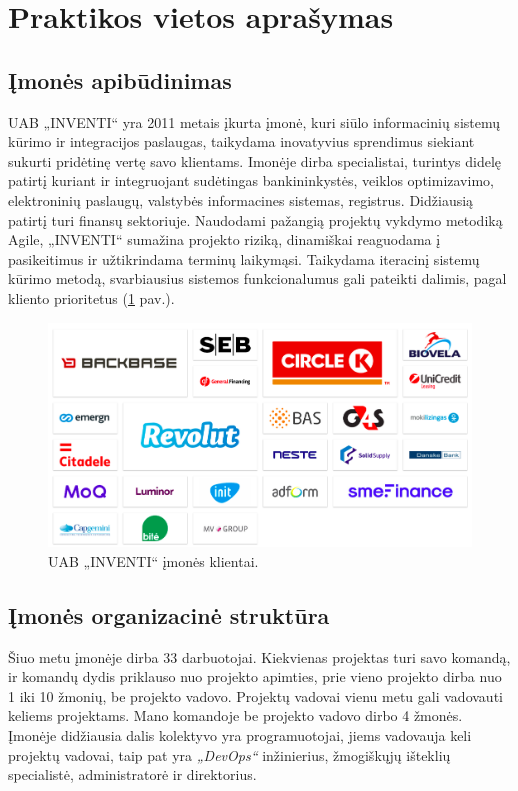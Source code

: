 \section{Praktikos vietos aprašymas}

\subsection{Įmonės apibūdinimas}
UAB „INVENTI“ yra 2011 metais įkurta įmonė, kuri siūlo informacinių sistemų kūrimo ir integracijos paslaugas,
taikydama inovatyvius sprendimus siekiant sukurti pridėtinę vertę savo klientams.
Imonėje dirba specialistai, turintys didelę patirtį kuriant ir integruojant sudėtingas bankininkystės, veiklos optimizavimo, elektroninių paslaugų,
valstybės informacines sistemas, registrus. Didžiausią patirtį turi finansų sektoriuje.
Naudodami pažangią projektų vykdymo metodiką Agile, „INVENTI“ sumažina projekto riziką, dinamiškai reaguodama į pasikeitimus ir užtikrindama terminų laikymąsi.
Taikydama iteracinį sistemų kūrimo metodą, svarbiausius sistemos funkcionalumus gali pateikti dalimis, pagal kliento prioritetus (\ref{img:clients} pav.\footnotemark[1]).

\begin{figure}[H]
    \centering
    \includegraphics[scale=0.4]{img/clients.png}
    \caption{UAB „INVENTI“ įmonės klientai.}
    \label{img:clients}
\end{figure}


\subsection{Įmonės organizacinė struktūra}
Šiuo metu įmonėje dirba 33 darbuotojai. Kiekvienas projektas turi savo komandą,
ir komandų dydis priklauso nuo projekto apimties, prie vieno projekto dirba nuo 1 iki 10 žmonių, be projekto vadovo. Projektų vadovai vienu metu gali
vadovauti keliems projektams. Mano komandoje be projekto vadovo dirbo 4 žmonės. Įmonėje didžiausia dalis kolektyvo yra programuotojai, jiems vadovauja keli projektų vadovai,
taip pat yra \textit{„DevOps“} inžinierius, žmogiškųjų išteklių specialistė, administratorė ir direktorius.


